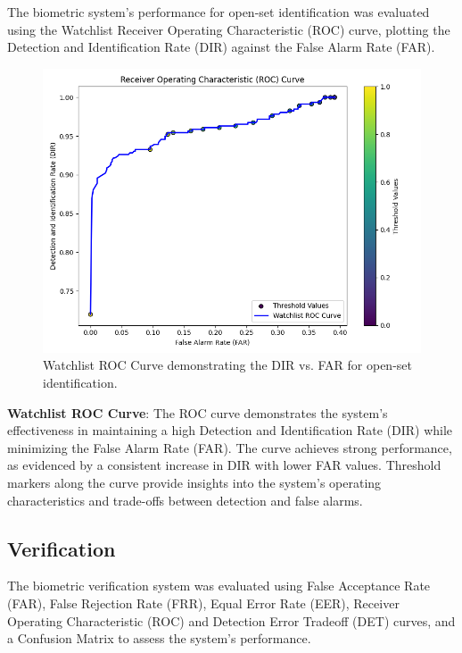 The biometric system's performance for open-set identification was evaluated using the Watchlist Receiver Operating Characteristic (ROC) curve, plotting the Detection and Identification Rate (DIR) against the False Alarm Rate (FAR).

\begin{figure}[!ht]
    \centering
    \includegraphics[width=\columnwidth]{./images/plots/id-open/watchlist_roc_curve.png}
    \caption{Watchlist ROC Curve demonstrating the DIR vs. FAR for open-set identification.}
    \label{fig:watchlist_roc_curve}
\end{figure}

\textbf{Watchlist ROC Curve}: The ROC curve demonstrates the system's effectiveness in maintaining a high Detection and Identification Rate (DIR) while minimizing the False Alarm Rate (FAR). The curve achieves strong performance, as evidenced by a consistent increase in DIR with lower FAR values. Threshold markers along the curve provide insights into the system's operating characteristics and trade-offs between detection and false alarms. 

\subsection{Verification}

The biometric verification system was evaluated using False Acceptance Rate (FAR), False Rejection Rate (FRR), Equal Error Rate (EER), Receiver Operating Characteristic (ROC) and Detection Error Tradeoff (DET) curves, and a Confusion Matrix to assess the system's performance.


